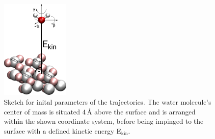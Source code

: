 \documentclass[11pt,DIV=13,BCOR=5mm,a4paper,headinclude]{scrbook}
\begin{document}
\begin{figure}[!ht]
 \centering
\includegraphics[width=0.3\textwidth]{figures/0001/perspective+h2o_new.png}
 \caption{Sketch for inital parameters of the trajectories.
The water molecule's center of mass is situated $4\,$\AA{} above the surface and is arranged within the shown coordinate system, before being impinged to the surface with a defined kinetic energy E$_\textrm{kin}$.}
        \label{abb:initial_parameters}
 \end{figure}
 
\end{document}
